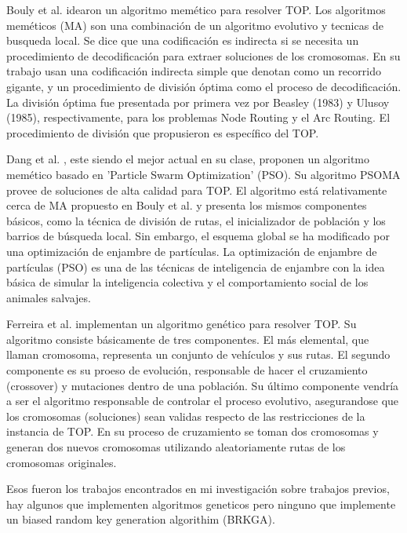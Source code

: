 \bigskip

Bouly et al. \cite{BoulyDangMoukrim} idearon un algoritmo memético para resolver TOP. Los algoritmos meméticos (MA) son una combinación de un algoritmo evolutivo y tecnicas de busqueda local. Se dice que una codificación es indirecta si se necesita un procedimiento de decodificación para extraer soluciones de los cromosomas. En su trabajo usan una codificación indirecta simple que denotan como un recorrido gigante, y un procedimiento de división óptima como el proceso de decodificación. La división óptima fue presentada por primera vez por Beasley (1983) y Ulusoy (1985), respectivamente, para los problemas Node Routing y el Arc Routing. El procedimiento de división que propusieron es específico del TOP.

\bigskip

Dang et al. \cite{DangGuibadjMoukrim}, este siendo el mejor actual en su clase, proponen un algoritmo memético basado en 'Particle Swarm Optimization'
(PSO). Su algoritmo PSOMA provee de soluciones de alta calidad para TOP. El algoritmo está relativamente cerca de MA propuesto en Bouly et al. \cite{BoulyDangMoukrim} y presenta los mismos componentes básicos, como la técnica de división de rutas, el inicializador de población y los barrios de búsqueda local. Sin embargo, el esquema global se ha modificado por una optimización de enjambre de partículas. La optimización de enjambre de partículas (PSO) es una de las técnicas de inteligencia de enjambre con la idea básica de simular la inteligencia colectiva y el comportamiento social de los animales salvajes.

\bigskip

 Ferreira et al. \cite{FerreiraQuintasOliveiraPereiraDias} implementan un algoritmo genético para resolver TOP. Su algoritmo consiste básicamente de tres componentes. El más elemental, que llaman cromosoma, representa un conjunto de vehículos y sus rutas. El segundo componente es su proeso de evolución, responsable de hacer el cruzamiento (crossover) y mutaciones dentro de una población. Su último componente vendría a ser el algoritmo responsable de controlar el proceso evolutivo, asegurandose que los cromosomas (soluciones) sean validas respecto de las restricciones de la instancia de TOP. En su proceso de cruzamiento se toman dos cromosomas y generan dos nuevos cromosomas utilizando aleatoriamente rutas de los cromosomas originales.


\bigskip

Esos fueron los trabajos encontrados en mi investigación sobre trabajos previos, hay algunos que implementen algoritmos geneticos pero ninguno que implemente un biased random key generation algorithim (BRKGA).









